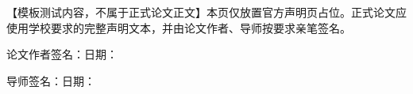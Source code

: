 
【模板测试内容，不属于正式论文正文】本页仅放置官方声明页占位。正式论文应使用学校要求的完整声明文本，并由论文作者、导师按要求亲笔签名。

\vspace{1cm}
\noindent 论文作者签名：\underline{\hspace{4cm}}\hfill 日期：\underline{\hspace{4cm}}

\vspace{1cm}
\noindent 导师签名：\underline{\hspace{4cm}}\hfill 日期：\underline{\hspace{4cm}}

